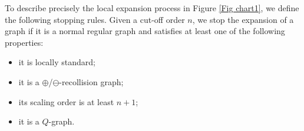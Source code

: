 \documentclass{article}
\newcommand{\1}{\mathds{1}}
\numberwithin{equation}{section}
\newcommand{\fa}{{\mathfrak a}}
\newcommand{\fb}{{\mathfrak b}}
\theoremstyle{plain} %
\theoremstyle{remark}
\newcommand{\cor}{\color{red}}
\newcommand{\hty}[1]{{\cor (ht: #1) }}
\begin{document}
To describe precisely the local expansion process in  Figure \ref{Fig chart1}, we  define the following  stopping rules.  
Given a cut-off order $n$, we stop the expansion of a graph if it is a normal regular graph %
and satisfies at least one of the following properties:
\begin{itemize}
\item[(S1)] it is locally standard;

\item[(S2)] it is a $\oplus$/$\ominus$-recollision graph;

\item[(S3)] its scaling order is at least $n+1$; 

\item[(S4)] it is a $Q$-graph.
\end{itemize}
\end{document}
